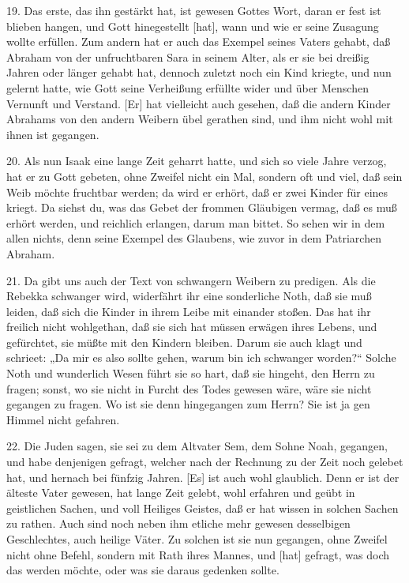 19. Das erste, das ihn gestärkt hat, ist gewesen Gottes Wort, daran er fest ist blieben hangen, und Gott hinegestellt [hat], wann und wie er seine Zusagung wollte erfüllen. Zum andern hat er auch das Exempel seines Vaters gehabt, daß Abraham von der unfruchtbaren Sara in seinem Alter, als er sie bei dreißig Jahren oder länger gehabt hat, dennoch zuletzt noch ein Kind kriegte, und nun gelernt hatte, wie Gott seine Verheißung erfüllte wider und über Menschen Vernunft und Verstand. [Er] hat vielleicht auch gesehen, daß die andern Kinder Abrahams von den andern Weibern übel gerathen sind, und ihm nicht wohl mit ihnen ist gegangen.

20. Als nun Isaak eine lange Zeit geharrt hatte, und sich so viele Jahre verzog, hat er zu Gott gebeten, ohne Zweifel nicht ein Mal, sondern oft und viel, daß sein Weib möchte fruchtbar werden; da wird er erhört, daß er zwei Kinder für eines kriegt. Da siehst du, was das Gebet der frommen Gläubigen vermag, daß es muß erhört werden, und reichlich erlangen, darum man bittet. So sehen wir in dem allen nichts, denn seine Exempel des Glaubens, wie zuvor in dem Patriarchen Abraham.

21. Da gibt uns auch der Text von schwangern Weibern zu predigen. Als die Rebekka schwanger wird, widerfährt ihr eine sonderliche Noth, daß sie muß leiden, daß sich die Kinder in ihrem Leibe mit einander stoßen. Das hat ihr freilich nicht wohlgethan, daß sie sich hat müssen erwägen ihres Lebens, und gefürchtet, sie müßte mit den Kindern bleiben. Darum sie auch klagt und schrieet: „Da mir es also sollte gehen, warum bin ich schwanger worden?“ Solche Noth und wunderlich Wesen führt sie so hart, daß sie hingeht, den Herrn zu fragen; sonst, wo sie nicht in Furcht des Todes gewesen wäre, wäre sie nicht gegangen zu fragen. Wo ist sie denn hingegangen zum Herrn? Sie ist ja gen Himmel nicht gefahren.

22. Die Juden sagen, sie sei zu dem Altvater Sem, dem Sohne Noah, gegangen, und habe
denjenigen gefragt, welcher nach der Rechnung zu der Zeit noch gelebet hat, und hernach bei fünfzig Jahren. [Es] ist auch wohl glaublich. Denn er ist der älteste Vater gewesen, hat lange Zeit gelebt, wohl erfahren und geübt in geistlichen Sachen, und voll Heiliges Geistes, daß er hat wissen in solchen Sachen zu rathen. Auch sind noch neben ihm etliche mehr gewesen desselbigen Geschlechtes, auch heilige Väter. Zu solchen ist sie nun gegangen, ohne Zweifel nicht ohne Befehl, sondern mit Rath ihres Mannes, und [hat] gefragt, was doch das werden möchte, oder was sie daraus gedenken sollte.

